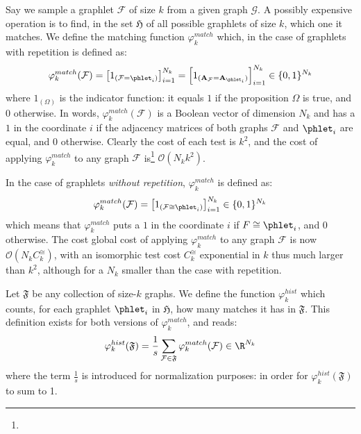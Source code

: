 Say we sample a graphlet $\mathcal{F}$ of size $k$ from a given graph $\mathcal{G}$. A possibly expensive operation is to find, in the set $\mathfrak{H}$ of all possible graphlets of size $k$, which one it matches. We define the matching function $\varphi_{k}^{match}$ which, in the case of graphlets with repetition is defined as: 
\[
\varphi_k^{match}(\mathcal{F}) = \left[ 1_{(\mathcal{F} = \phlet_i)}\right]_{i=1}^{N_k}= \left[ 1_{(\mathbf{A}_\mathcal{F} = \mathbf{A}_{\phlet_i})}\right]_{i=1}^{N_k} \in \{0,1\}^{N_k}
\]
where $1_{(\Omega)}$ is the indicator function: it equals $1$ if the proposition $\Omega$ is true, and $0$ otherwise. 
In words, $\varphi_k^{match}(\mathcal{F})$ is a Boolean vector of dimension $N_k$ and has a $1$ in the coordinate $i$ if the adjacency matrices of both graphs $\mathcal{F}$ and $\phlet_i$ are equal, and $0$ otherwise. Clearly the cost of each test is $k^2$, and the cost of applying $\varphi^{match}_k$ to any graph $\mathcal{F}$ is\footnote{} $\mathcal{O}(N_k k^2)$. 

In the case of graphlets \emph{without repetition}, $\varphi_k^{match}$ is defined as:
\[
\varphi_k^{match}(\mathcal{F}) = \left[ 1_{(\mathcal{F} \cong \phlet_i)}\right]_{i=1}^{N_k} \in \{0,1\}^{N_k}
\]
which means that $\varphi_k^{match}$ puts a $1$ in the coordinate $i$ if $F\cong \phlet_i$, and $0$ otherwise. The cost global cost of applying $\varphi^{match}_k$ to any graph $\mathcal{F}$ is now $\mathcal{O}(N_k C^{\cong}_k)$, with an isomorphic test cost $C^{\cong}_k$ exponential in $k$ thus much larger than $k^2$, although for a $N_k$ smaller than the case with repetition.  

Let $\mathfrak{F}$ be any collection of size-$k$ graphs. We define the function $\varphi_k^{hist}$ which counts, for each graphlet $\phlet_i$ in $\mathfrak{H}$, how many matches it has in $\mathfrak{F}$. This definition exists for both versions of $\varphi_k^{match}$, and reads:
\begin{align}
	\label{eq:def:phi_hist}
	\varphi_k^{hist}(\mathfrak{F})=\frac{1}{s}\sum_{\mathcal{F}\in\mathfrak{F}} \varphi_k^{match} (\mathcal{F}) \in \R^{N_k}
\end{align}
where the term $\frac{1}{s}$ is introduced for normalization purposes: in order for  $\varphi_k^{hist}(\mathfrak{F})$ to sum to 1. %


